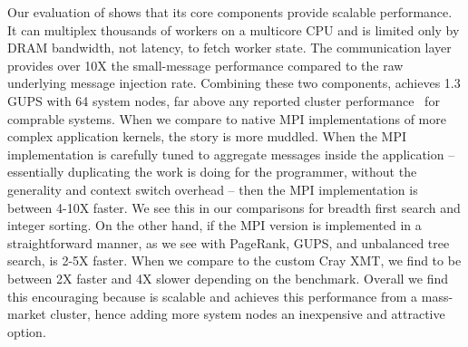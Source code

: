 Our evaluation of \Grappa shows that its core components provide scalable performance.  It can multiplex thousands of workers on a multicore CPU and is limited only by DRAM bandwidth, not latency, to fetch worker state.  The communication layer provides over 10X the small-message performance compared to the raw underlying message injection rate.  Combining these two components, \Grappa achieves 1.3 GUPS with 64 system nodes, far above any reported cluster performance~\cite{gups} for comprable systems.  When we compare \Grappa to native MPI implementations of more complex application kernels, the story is more muddled.  When the MPI implementation is carefully tuned to aggregate messages inside the application -- essentially duplicating the work \Grappa is doing for the programmer, without the generality and context switch overhead -- then the MPI implementation is between 4-10X faster.  We see this in our comparisons for breadth first search and integer sorting.  On the other hand, if the MPI version is implemented in a straightforward manner, as we see with PageRank, GUPS, and unbalanced tree search, \Grappa is 2-5X faster.  When we compare \Grappa to the custom Cray XMT, we find \Grappa to be between 2X faster and 4X slower depending on the benchmark.  Overall we find this encouraging because \Grappa is scalable and achieves this performance from a mass-market cluster, hence adding more system nodes an inexpensive and attractive option.
 



